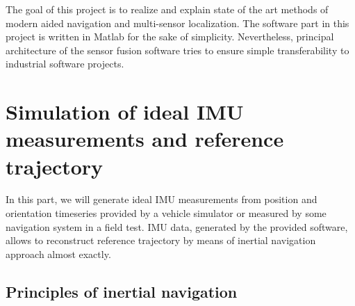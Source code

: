 \documentclass[conference]{IEEEtran}
\begin{document}
The goal of this project is to realize and explain state of the art methods of modern aided navigation and multi-sensor localization. The software part in this project is written in Matlab for the sake of simplicity. Nevertheless, principal architecture of the sensor fusion software tries to ensure simple transferability to industrial software projects.








\section{Simulation of ideal IMU measurements and reference trajectory}

In this part, we will generate ideal IMU measurements from position and orientation timeseries provided by a vehicle simulator or measured by some navigation system in a field test. IMU data, generated by the provided software, allows to reconstruct reference trajectory by means of inertial navigation approach almost exactly.

\subsection{Principles of inertial navigation}
\end{document}

